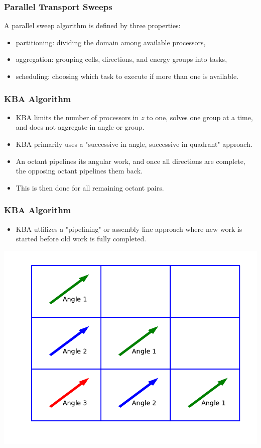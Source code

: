 \documentclass[xcolor={usenames,dvipsnames,svgnames,table}]{beamer}
\begin{document}
\begin{frame}[t]\frametitle{Parallel Transport Sweeps}

\begin{block}{A parallel sweep algorithm is defined by three properties:}
\begin{itemize}
\item partitioning: dividing the domain among available processors,
\item aggregation: grouping cells, directions, and energy groups into tasks,
\item scheduling: choosing which task to execute if more than one is available.
\end{itemize}
\end{block}
\end{frame}


\begin{frame}[t]\frametitle{KBA Algorithm}
\begin{block}{}
\begin{itemize}
\item KBA limits the number of processors in $z$ to one, solves one group at a time, and does not aggregate in angle or group.
\item KBA primarily uses a "successive in angle, successive in quadrant" approach.
\item An octant pipelines its angular work, and once all directions are complete, the opposing octant pipelines them back.
\item This is then done for all remaining octant pairs.
\end{itemize}
\end{block}
\end{frame}

\begin{frame}[t]\frametitle{KBA Algorithm}
\begin{block}{}
\begin{itemize}
\item KBA utlilizes a "pipelining" or assembly line approach where new work is started before old work is fully completed.
\end{itemize}
\end{block}
\centering
\includegraphics[scale=0.6,trim={0cm 1cm 0cm 0cm},clip]{../figures/pipeline_example.pdf}
\end{frame}
\end{document}

